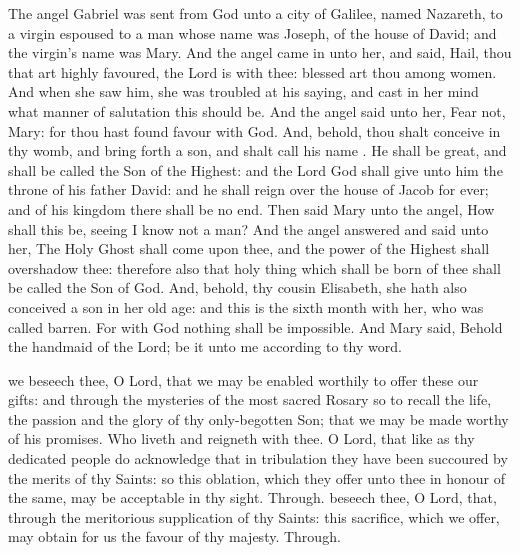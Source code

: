 
 The angel Gabriel was sent from God unto a city of Galilee, named Nazareth, to a virgin espoused to a man whose name was Joseph, of the house of David; and the virgin’s name was Mary. And the angel came in unto her, and said, Hail, thou that art highly favoured, the Lord is with thee: blessed art thou among women. And when she saw him, she was troubled at his saying, and cast in her mind what manner of salutation this should be. And the angel said unto her, Fear not, Mary: for thou hast found favour with God. And, behold, thou shalt conceive in thy womb, and bring forth a son, and shalt call his name . He shall be great, and shall be called the Son of the Highest: and the Lord God shall give unto him the throne of his father David: and he shall reign over the house of Jacob for ever; and of his kingdom there shall be no end. Then said Mary unto the angel, How shall this be, seeing I know not a man? And the angel answered and said unto her, The Holy Ghost shall come upon thee, and the power of the Highest shall overshadow thee: therefore also that holy thing which shall be born of thee shall be called the Son of God. And, behold, thy cousin Elisabeth, she hath also conceived a son in her old age: and this is the sixth month with her, who was called barren. For with God nothing shall be impossible. And Mary said, Behold the handmaid of the Lord; be it unto me according to thy word.


\secret
{} we beseech thee, O Lord, that we may be enabled worthily to offer these our gifts: and through the mysteries of the most sacred Rosary so to recall the life, the passion and the glory of thy only-begotten Son; that we may be made worthy of his promises. Who liveth and reigneth with thee.
 O Lord, that like as thy dedicated people do acknowledge that in tribulation they have been succoured by the merits of thy Saints: so this oblation, which they offer unto thee in honour of the same, may be acceptable in thy sight. Through.
 beseech thee, O Lord, that, through the meritorious supplication of thy Saints: this sacrifice, which we offer, may obtain for us the favour of thy majesty. Through.

